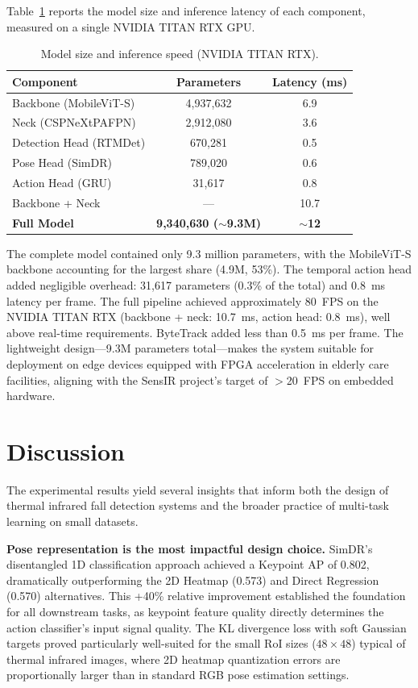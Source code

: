 Table~\ref{tab:computational_cost} reports the model size and inference latency of each component, measured on a single NVIDIA TITAN RTX GPU.

\begin{table}[t]
\centering
\caption{Model size and inference speed (NVIDIA TITAN RTX).}
\label{tab:computational_cost}
\begin{tabular}{|l|c|c|}
\hline
Component & Parameters & Latency (ms) \\
\hline
Backbone (MobileViT-S) & 4{,}937{,}632 & 6.9 \\
Neck (CSPNeXtPAFPN) & 2{,}912{,}080 & 3.6 \\
Detection Head (RTMDet) & 670{,}281 & 0.5 \\
Pose Head (SimDR) & 789{,}020 & 0.6 \\
Action Head (GRU) & 31{,}617 & 0.8 \\
\hline
Backbone + Neck & --- & 10.7 \\
\textbf{Full Model} & \textbf{9{,}340{,}630 ($\sim$9.3M)} & \textbf{$\sim$12} \\
\hline
\end{tabular}
\end{table}

The complete model contained only 9.3 million parameters, with the MobileViT-S backbone accounting for the largest share (4.9M, 53\%). The temporal action head added negligible overhead: 31{,}617 parameters (0.3\% of the total) and 0.8~ms latency per frame. The full pipeline achieved approximately 80~FPS on the NVIDIA TITAN RTX (backbone + neck: 10.7~ms, action head: 0.8~ms), well above real-time requirements. ByteTrack added less than 0.5~ms per frame. The lightweight design---9.3M parameters total---makes the system suitable for deployment on edge devices equipped with FPGA acceleration in elderly care facilities, aligning with the SensIR project's target of $>$20~FPS on embedded hardware.

\section{Discussion}
\label{sec:discussion}

The experimental results yield several insights that inform both the design of thermal infrared fall detection systems and the broader practice of multi-task learning on small datasets.

\textbf{Pose representation is the most impactful design choice.} SimDR's disentangled 1D classification approach achieved a Keypoint AP of 0.802, dramatically outperforming the 2D Heatmap (0.573) and Direct Regression (0.570) alternatives. This +40\% relative improvement established the foundation for all downstream tasks, as keypoint feature quality directly determines the action classifier's input signal quality. The KL divergence loss with soft Gaussian targets proved particularly well-suited for the small RoI sizes ($48 \times 48$) typical of thermal infrared images, where 2D heatmap quantization errors are proportionally larger than in standard RGB pose estimation settings.

